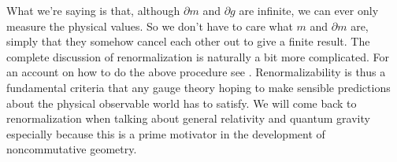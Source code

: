 What we're saying is that, although $\partial m$ and $\partial g$ are infinite, we can ever only measure the physical values. So we don't have to care what $m$ and $\partial m$ are, simply that they somehow cancel each other out to give a finite result. The complete discussion of renormalization is naturally a bit more complicated. For an account on how to do the above procedure see \cite{sakurai1967aqm}. Renormalizability is thus a fundamental criteria that any gauge theory hoping to make sensible predictions about the physical observable world has to satisfy. We will come back to renormalization when talking about general relativity and quantum gravity especially because this is a prime motivator in the development of noncommutative geometry.
